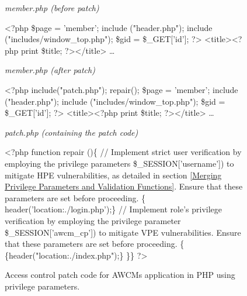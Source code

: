 \documentclass[10pt,journal,compsoc]{IEEEtran}
\begin{document}
\begin{CJK}{UTF8}{gbsn}
\begin{figure*}[h]
\begin{minipage}[t]{0.48\textwidth}
\begin{algorithm}[H]
\small
\renewcommand{\thealgorithm}{}
\caption{\textit{member.php (before patch)}}
\begin{algorithmic}[1]
\State \textless?php
\State \$page = 'member';
\State include ("header.php");
\State include ("includes/window\_top.php");
\State \$gid = \$\_GET['id'];
\State ?\textgreater
\State <title\textgreater \textless?php print \$title; ?\textgreater \textless/title\textgreater 
\State …
\end{algorithmic}
\end{algorithm}
\end{minipage}
\hfill
\begin{minipage}[t]{0.48\textwidth}
\begin{algorithm}[H]
\renewcommand{\thealgorithm}{}
\small
{}
\caption{\textit{member.php (after patch)}}
\begin{algorithmic}[1]
\State \textless?php
\State \textcolor[rgb]{0.16,0.32,0.66}{include("patch.php"); }
\State \textcolor[rgb]{0.16,0.32,0.66}{repair();}
\State \$page = 'member';
\State include ("header.php");
\State include ("includes/window\_top.php");
\State \$gid = \$\_GET['id'];
\State ?\textgreater 
\State \textless title\textgreater \textless?php print \$title; ?\textgreater \textless/title\textgreater 
\State …
\end{algorithmic}
\end{algorithm}
\end{minipage}
\hfill
\begin{minipage}[t]{1\textwidth}
\begin{algorithm}[H]
\renewcommand{\thealgorithm}{}
\small
{}
\caption{\textit{patch.php (containing the patch code)}}
\begin{algorithmic}[1]
\State \textless?php
\State function repair ()\{
\Statex \textcolor[rgb]{0.16,0.32,0.66}{// Implement strict user verification by employing the privilege parameters \$\_SESSION['username']) to mitigate HPE vulnerabilities, as detailed in section \ref{Merging Privilege Parameters and Validation Functions}. Ensure that these parameters are set before proceeding.}
\{ 
    \State header('location:./login.php');\}
\EndIf
\Statex \textcolor[rgb]{0.16,0.32,0.66}{// Implement role's privilege verification by employing the privilege parameter \$\_SESSION['awcm\_cp']) to mitigate VPE vulnerabilities. Ensure that these parameters are set before proceeding.}
\{ 
        \State \{header("location:./index.php");\}
    \EndIf
\EndIf
\State \}\}
\State?\textgreater 
\end{algorithmic}
\end{algorithm}
\end{minipage}%
\hfill
\caption{Access control patch code for AWCMs application in PHP using privilege parameters.}
\label{AWCMs}
\end{figure*}


\end{CJK}
\end{document}
